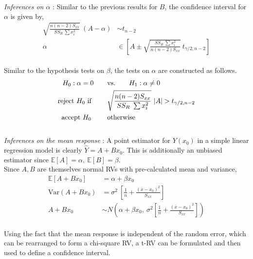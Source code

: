 \textit{Inferences on $ \alpha $} : Similar to the previous results for $ B $, the confidence interval for $ \alpha $ is given by,\\

\begin{align}
	\sqrt{\frac{n(n-2) S_{xx}}{SS_R\ \sum x_i^2}}\ (A - \alpha) &\sim t_{n-2} \\
	\alpha &\in \left[ A \pm  \sqrt{\frac{SS_R\ \sum x_i^2}{n(n-2) S_{xx}}}\ t_{\gamma/2, n-2} \right] 
\end{align}\\

Similar to the hypothesis tests on $ \beta $, the tests on $ \alpha $ are constructed as follows.\\ 

\begin{align}
	H_0 : \alpha = 0 \qquad &\text{vs.} \qquad H_1 : \alpha \neq 0 \nonumber \\
	\text{reject $ H_0 $ if } \qquad & \sqrt{\frac{n(n-2) S_{xx}}{SS_R\ \sum x_i^2}}\ |A| > t_{\gamma/2, n-2} \nonumber \\
	\text{accept $ H_0 $  } \qquad & \text{otherwise}
\end{align}\\

\textit{Inferences on the mean response} : A point estimator for $ Y(x_0) $ in a simple linear regression model is clearly $ \widehat{Y} = A + Bx_0$. This is additionally an unbiased estimator since $ \mathbb{E}[A] = \alpha,\ \mathbb{E}[B] = \beta $.\\

Since $ A, B $ are themselves normal RVs with pre-calculated mean and variance, \\

\begin{align}
	\mathbb{E}[A + B x_0] &= \alpha + \beta x_0 \\
	\mathrm{Var}(A + B x_0) &= \sigma^2\ \left[\frac{1}{n} + \frac{(\overline{x} - x_0)^2}{S_{xx}}\right] \\
	A + B x_0 &\sim N\left( \alpha + \beta x_0,\ \sigma^2 \left[\frac{1}{n} + \frac{(\overline{x} - x_0)^2}{S_{xx}} \right]\right)
\end{align}\\

Using the fact that the mean response is independent of the random error, which can be rearranged to form a chi-square RV, a t-RV can be formulated and then used to define a confidence interval.\\

